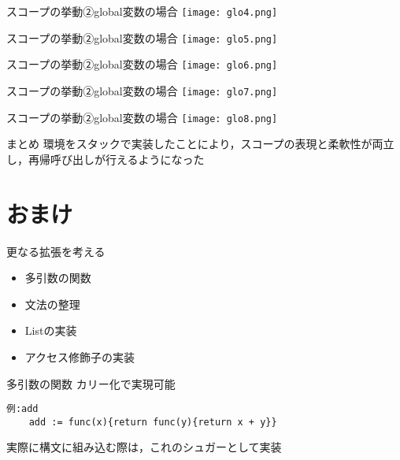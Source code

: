 \documentclass[uplatex,dvipdfmx,ja=standard]{beamer}
\begin{document}
\begin{frame}[fragile]{スコープの挙動②global変数の場合}
    \centering 
    \texttt{[image: glo4.png]}
\end{frame}

\begin{frame}[fragile]{スコープの挙動②global変数の場合}
    \centering 
    \texttt{[image: glo5.png]}
\end{frame}

\begin{frame}[fragile]{スコープの挙動②global変数の場合}
    \centering 
    \texttt{[image: glo6.png]}
\end{frame}

\begin{frame}[fragile]{スコープの挙動②global変数の場合}
    \centering 
    \texttt{[image: glo7.png]}
\end{frame}

\begin{frame}[fragile]{スコープの挙動②global変数の場合}
    \centering 
    \texttt{[image: glo8.png]}
\end{frame}

\begin{frame}{まとめ}
環境をスタックで実装したことにより，スコープの表現と柔軟性が両立し，再帰呼び出しが行えるようになった
\end{frame}

\section{おまけ}

\begin{frame}{更なる拡張を考える}
    \begin{itemize}
        \item 多引数の関数
        \item 文法の整理
        \item Listの実装
        \item アクセス修飾子の実装
    \end{itemize}
\end{frame}

\begin{frame}[fragile]{多引数の関数}
    カリー化で実現可能
    \begin{verbatim}
例:add
    add := func(x){return func(y){return x + y}}
    \end{verbatim}
    実際に構文に組み込む際は，これのシュガーとして実装
\end{frame}
\end{document}
